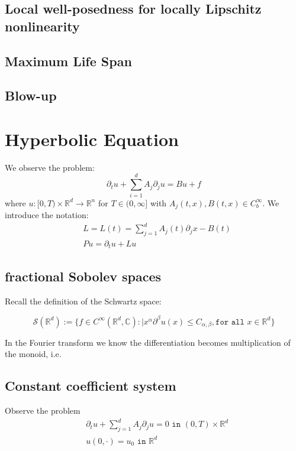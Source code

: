 \subsection{Local well-posedness for locally Lipschitz nonlinearity}


\subsection{Maximum Life Span}


\subsection{Blow-up}



\section{Hyperbolic Equation}
We observe the problem:
\begin{equation}
	\partial_t u + \sum_{i = 1}^d A_j \partial_j u = B u + f
\end{equation}
where $u:[0, T) \times \mathbb{R}^d \rightarrow \mathbb{R}^n$ for $T \in (0, \infty]$ with $A_j(t, x), B(t, x) \in C_b^\infty$. We introduce the notation:
\begin{align*}
	&L = L(t) = \sum_{j = 1}^d A_j(t) \partial_j x - B(t)\\
	&Pu = \partial_t u + Lu
\end{align*}


\subsection{fractional Sobolev spaces}
Recall the definition of the Schwartz space:
\begin{definition}
\begin{equation}
	\mathcal{S}(\mathbb{R}^d):= \{ f \in C^\infty(\mathbb{R}^d, \mathbb{C}): |x^\alpha \partial^\beta u(x) \le C_{\alpha, \beta}, \texttt{for all } x \in \mathbb{R}^d\}	
\end{equation}
\end{definition}

In the Fourier transform we know the differentiation becomes multiplication of the monoid, i.e.


\subsection{Constant coefficient system}
Observe the problem
\begin{align*}
	& \partial_t u + \sum_{ j = 1}^d A_j \partial_j u = 0 \texttt{ in } (0, T) \times \mathbb{R}^d\\
	& u(0, \cdot) = u_0 \texttt{ in } \mathbb{R}^d
\end{align*}



